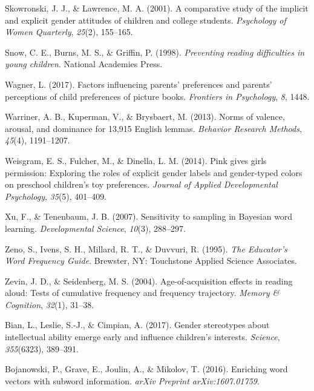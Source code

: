 \documentclass[
  english,
  ,man,floatsintext]{apa6}
\begin{document}
\leavevmode\hypertarget{ref-skowronski2001comparative}{}%
Skowronski, J. J., \& Lawrence, M. A. (2001). A comparative study of the implicit and explicit gender attitudes of children and college students. \emph{Psychology of Women Quarterly}, \emph{25}(2), 155--165.

\leavevmode\hypertarget{ref-snow1998preventing}{}%
Snow, C. E., Burns, M. S., \& Griffin, P. (1998). \emph{Preventing reading difficulties in young children}. National Academies Press.

\leavevmode\hypertarget{ref-wagner2017factors}{}%
Wagner, L. (2017). Factors influencing parents' preferences and parents' perceptions of child preferences of picture books. \emph{Frontiers in Psychology}, \emph{8}, 1448.

\leavevmode\hypertarget{ref-warriner2013norms}{}%
Warriner, A. B., Kuperman, V., \& Brysbaert, M. (2013). Norms of valence, arousal, and dominance for 13,915 English lemmas. \emph{Behavior Research Methods}, \emph{45}(4), 1191--1207.

\leavevmode\hypertarget{ref-weisgram2014pink}{}%
Weisgram, E. S., Fulcher, M., \& Dinella, L. M. (2014). Pink gives girls permission: Exploring the roles of explicit gender labels and gender-typed colors on preschool children's toy preferences. \emph{Journal of Applied Developmental Psychology}, \emph{35}(5), 401--409.

\leavevmode\hypertarget{ref-xu2007b}{}%
Xu, F., \& Tenenbaum, J. B. (2007). Sensitivity to sampling in Bayesian word learning. \emph{Developmental Science}, \emph{10}(3), 288--297.

\leavevmode\hypertarget{ref-tasa_norms}{}%
Zeno, S., Ivens, S. H., Millard, R. T., \& Duvvuri, R. (1995). \emph{The Educator's Word Frequency Guide}. Brewster, NY: Touchstone Applied Science Associates.

\leavevmode\hypertarget{ref-zevin2004age}{}%
Zevin, J. D., \& Seidenberg, M. S. (2004). Age-of-acquisition effects in reading aloud: Tests of cumulative frequency and frequency trajectory. \emph{Memory \& Cognition}, \emph{32}(1), 31--38.

\leavevmode\hypertarget{ref-bian2017gender}{}%
Bian, L., Leslie, S.-J., \& Cimpian, A. (2017). Gender stereotypes about intellectual ability emerge early and influence children's interests. \emph{Science}, \emph{355}(6323), 389--391.

\leavevmode\hypertarget{ref-bojanowski2016enriching}{}%
Bojanowski, P., Grave, E., Joulin, A., \& Mikolov, T. (2016). Enriching word vectors with subword information. \emph{arXiv Preprint arXiv:1607.01759}.
\end{document}
